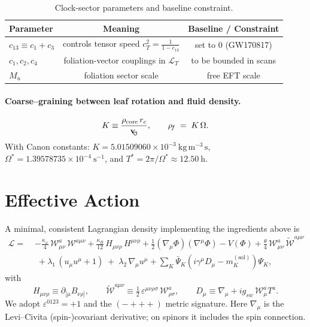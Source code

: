 \documentclass[11pt, preprint,titlepage]{revtex4-2}
\newcommand{\rhoF}{\rho_{\!f}}      %
\newcommand{\rhocore}{\rho_{\mathrm{core}}} %
\newcommand{\swirlarrow}{\!\!\scriptsize\boldsymbol{\circlearrowleft}}
\newcommand{\vswirl}{\mathbf{v}_{\swirlarrow}}
\begin{document}
	\begin{table}[h]
		\centering
		\caption{Clock-sector parameters and baseline constraint.}
		\begin{tabular}{lcc}
			\hline
			Parameter & Meaning & Baseline / Constraint \\
			\hline
			$c_{13} \equiv c_1 + c_3$ & controls tensor speed $c_T^2=\frac{1}{1-c_{13}}$ & set to $0$ (GW170817) \\
			$c_1,c_2,c_4$ & foliation-vector couplings in $\mathcal{L}_T$ & to be bounded in scans \\
			$M_u$ & foliation sector scale & free EFT scale \\
			\hline
		\end{tabular}
	\end{table}

	\paragraph{Coarse--graining between leaf rotation and fluid density.}
	\begin{equation}
		K \equiv \frac{\rhocore\, r_c}{\vswirl},
		\qquad
		\rhoF \;=\; K\,\Omega .
	\end{equation}
	With Canon constants: \(K = 5.01509060\times 10^{-3}\ \mathrm{kg\,m^{-3}\,s}\), \(\Omega^\ast = 1.39578735\times 10^{-4}\ \mathrm{s^{-1}}\), and \(T^\ast=2\pi/\Omega^\ast\approx 12.50\ \mathrm{h}\).


	\section{Effective Action}

	A minimal, consistent Lagrangian density implementing the ingredients above is
	\begin{align}
		\mathcal{L}
		=\;& -\frac{\kappa_\omega}{4}\,\mathcal{W}^a_{\mu\nu}\,\mathcal{W}^{a\mu\nu}
		+\frac{\kappa_B}{12}\,H_{\mu\nu\rho}\,H^{\mu\nu\rho}
		+\frac{1}{2}(\nabla_\mu\Phi)(\nabla^\mu\Phi)-V(\Phi)
		+\frac{\theta}{4}\,\mathcal{W}^a_{\mu\nu}\,\tilde{\mathcal{W}}^{a\mu\nu} \nonumber\\
		&\;+\lambda_1\,(u_\mu u^\mu+1)\;+\;\lambda_2\,\nabla_\mu u^\mu
		+\sum_K \bar\Psi_K\!\left(i\gamma^\mu D_\mu - m_K^{(\mathrm{sol})}\right)\!\Psi_K ,
		\label{eq:EFT}
	\end{align}
	with
	\[
		H_{\mu\nu\rho}\equiv \partial_{[\mu}B_{\nu\rho]},\qquad
		\tilde{\mathcal{W}}^{a\mu\nu}\equiv \tfrac{1}{2}\,\varepsilon^{\mu\nu\rho\sigma}\,\mathcal{W}^a_{\rho\sigma},\qquad
		D_\mu\equiv \nabla_\mu + i g_{\!sw}\,\mathcal{W}_\mu^a T^a .
	\]
	We adopt \(\varepsilon^{0123}=+1\) and the \((-+++)\) metric signature.
	Here \(\nabla_\mu\) is the Levi–Civita (spin-)covariant derivative; on spinors it includes the spin connection.
\end{document}
